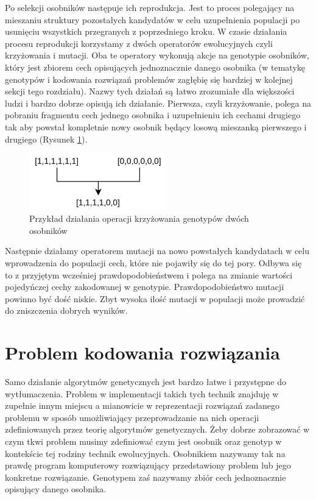 \documentclass[12pt, oneside, a4paper]{report}
\begin{document}
Po selekcji osobników następuje ich reprodukcja. Jest to proces polegający na mieszaniu struktury pozostałych kandydatów w celu uzupełnienia populacji po usunięciu wszystkich przegranych z poprzedniego kroku. W czasie działania procesu reprodukcji korzystamy z dwóch operatorów ewolucyjnych czyli krzyżowania i mutacji. Oba te operatory wykonują akcje na genotypie osobników, który jest zbiorem cech opisujących jednoznacznie danego osobnika (w tematykę genotypów i kodowania rozwiązań problemów zagłębię się bardziej w kolejnej sekcji tego rozdziału). Nazwy tych działań są łatwo zrozumiałe dla większości ludzi i bardzo dobrze opisują ich działanie. Pierwsza, czyli krzyżowanie, polega na pobraniu fragmentu cech jednego osobnika i uzupełnieniu ich cechami drugiego tak aby powstał kompletnie nowy osobnik będący losową mieszanką pierwszego i drugiego (Rysunek \ref{fig: 3.2}). 

\begin{figure}[h]
	\centering
	\includegraphics[width=6cm]{fig32.png}
	\caption{Przykład działania operacji krzyżowania genotypów dwóch osobników}
	\label{fig: 3.2}
\end{figure}

Następnie działamy operatorem mutacji na nowo powstałych kandydatach w celu wprowadzenia do populacji cech, które nie pojawiły się do tej pory. Odbywa się to z przyjętym wcześniej prawdopodobieństwem i polega na zmianie wartości pojedyńczej cechy zakodowanej w genotypie. Prawdopodobieństwo mutacji powinno być dość niskie. Zbyt wysoka ilość mutacji w populacji może prowadzić do zniszczenia dobrych wyników.

\section{Problem kodowania rozwiązania}

Samo działanie algorytmów genetycznych jest bardzo łatwe i przystępne do wytłumaczenia. Problem w implementacji takich tych technik znajduję w zupełnie innym miejscu a mianowicie w reprezentacji rozwiązań zadanego problemu w sposób umożliwiający przeprowadzanie na nich operacji zdefiniowanych przez teorię algorytmów genetycznych. Żeby dobrze zobrazować w czym tkwi problem musimy zdefiniować czym jest osobnik oraz genotyp w kontekście tej rodziny technik ewolucyjnych. Osobnikiem nazywamy tak na prawdę program komputerowy rozwiązujący przedstawiony problem lub jego konkretne rozwiązanie. Genotypem zaś nazywamy zbiór cech jednoznacznie opisujący danego osobnika. 
\end{document}
